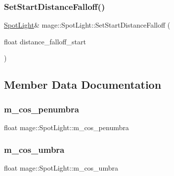 \hypertarget{classmage_1_1_spot_light_a0e31dd3527aafc860e7a5c31aaf673d1}{}\label{classmage_1_1_spot_light_a0e31dd3527aafc860e7a5c31aaf673d1} 
\subsubsection{\texorpdfstring{Set\+Start\+Distance\+Falloff()}{SetStartDistanceFalloff()}}
{\footnotesize\ttfamily \hyperlink{classmage_1_1_spot_light}{Spot\+Light}\& mage\+::\+Spot\+Light\+::\+Set\+Start\+Distance\+Falloff (\begin{DoxyParamCaption}\item[{float}]{distance\+\_\+falloff\+\_\+start }\end{DoxyParamCaption})}



\subsection{Member Data Documentation}
\hypertarget{classmage_1_1_spot_light_ac5d9f3426397abff72c5098b6e7e8472}{}\label{classmage_1_1_spot_light_ac5d9f3426397abff72c5098b6e7e8472} 
\subsubsection{\texorpdfstring{m\+\_\+cos\+\_\+penumbra}{m\_cos\_penumbra}}
{\footnotesize\ttfamily float mage\+::\+Spot\+Light\+::m\+\_\+cos\+\_\+penumbra\hspace{0.3cm}{\ttfamily [private]}}

\hypertarget{classmage_1_1_spot_light_a9afab31514f93d702f9e516491f262f2}{}\label{classmage_1_1_spot_light_a9afab31514f93d702f9e516491f262f2} 
\subsubsection{\texorpdfstring{m\+\_\+cos\+\_\+umbra}{m\_cos\_umbra}}
{\footnotesize\ttfamily float mage\+::\+Spot\+Light\+::m\+\_\+cos\+\_\+umbra\hspace{0.3cm}{\ttfamily [private]}}

